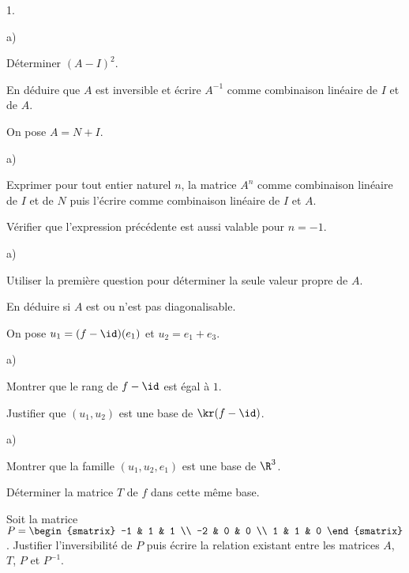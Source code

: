 \documentclass[11pt]{article}%
\begin{document}
\begin{noliste}{1.}
  \setlength{\itemsep}{4mm}
\item
  \begin{noliste}{a)}
    \setlength{\itemsep}{2mm}
  \item Déterminer $(A - I)^2$.
  \item En déduire que $A$ est inversible et écrire $A^{-1}$ comme
    combinaison linéaire de $I$ et de $A$.    
  \end{noliste}

\item On pose $A = N + I$.
  \begin{noliste}{a)}
    \setlength{\itemsep}{2mm}
  \item Exprimer pour tout entier naturel $n$, la matrice $A^n$ comme
    combinaison linéaire de $I$ et de $N$ puis l'écrire comme
    combinaison linéaire de $I$ et $A$.
  \item Vérifier que l'expression précédente est aussi valable pour
    $n=-1$.
  \end{noliste}

\item 
  \begin{noliste}{a)}
    \setlength{\itemsep}{2mm}
  \item Utiliser la première question pour déterminer la seule valeur
    propre de $A$.
  \item En déduire si $A$ est ou n'est pas diagonalisable.
  \end{noliste}

\item On pose $u_1 = (f - \id)(e_1)$ et $u_2 = e_1 + e_3$.
  \begin{noliste}{a)}
    \setlength{\itemsep}{2mm}
  \item Montrer que le rang de $f - \id$ est égal à $1$.
  \item Justifier que $(u_1, u_2)$ est une base de $\kr(f - \id)$.
  \end{noliste}

\item 
  \begin{noliste}{a)}
    \setlength{\itemsep}{2mm}
  \item Montrer que la famille $(u_1, u_2, e_1)$ est une base de $\R^3$.
  \item Déterminer la matrice $T$ de $f$ dans cette même base.
  \end{noliste}

\item Soit la matrice $P =
  \begin{smatrix}
    -1 & 1 & 1 \\
    -2 & 0 & 0 \\
    1 & 1 & 0
  \end{smatrix}
  $. Justifier l'inversibilité de $P$ puis écrire la relation existant
  entre les matrices $A$, $T$, $P$ et $P^{-1}$.


\end{noliste}
\end{document}
